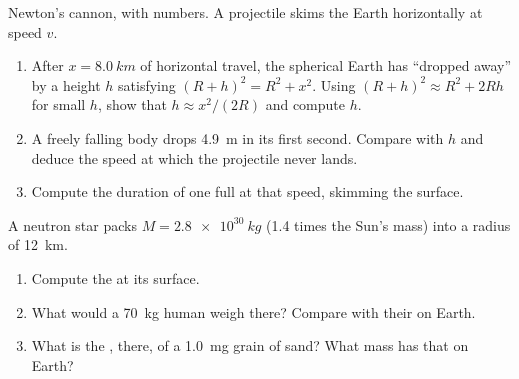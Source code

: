 \begin{exercise}[$\star\star\star$]\label{exo:g10:universal-gravitation:13}
Newton's cannon, with numbers. A projectile skims the Earth
horizontally at speed $v$.
\begin{enumerate}
  \item After $x = \qty{8.0}{km}$ of horizontal travel, the spherical
        Earth has ``dropped away'' by a height $h$ satisfying
        $(R + h)^2 = R^2 + x^2$. Using
        $(R + h)^2 \approx R^2 + 2Rh$ for small $h$, show that
        $h \approx x^2 / (2R)$ and compute $h$.
  \item A freely falling body drops \qty{4.9}{m} in its first second.
        Compare with $h$ and deduce the speed at which the projectile
        never lands.
  \item Compute the duration of one full  at that speed, skimming
        the surface.
\end{enumerate}
\end{exercise}

\begin{exercise}[$\star\star\star$]\label{exo:g10:universal-gravitation:14}
A neutron star packs $M = \qty{2.8e30}{kg}$ (1.4 times the Sun's mass)
into a radius of \qty{12}{km}.
\begin{enumerate}
  \item Compute the  at its surface.
  \item What would a \qty{70}{kg} human weigh there? Compare with their
         on Earth.
  \item What is the , there, of a \qty{1.0}{mg} grain of sand?
        What mass has that  on Earth?
\end{enumerate}
\end{exercise}

